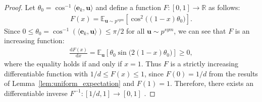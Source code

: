 \begin{proof}
Let $\theta_0=\cos^{-1}\langle \bm{e}_k, \bm{u} \rangle$ and define a function $F:[0,1]\rightarrow\mathbb{R}$ as follows:
\begin{align}
    F(x) = \mathbb{E}_{\bm{u}\sim p^{sym}}\left[ \cos^2\big( (1-x)\theta_0 \big) \right].
\end{align}
Since $0\leq\theta_0=\cos^{-1}(\langle \bm{e}_k, \bm{u} \rangle)\leq \pi/2$ for all $\bm{u}\sim p^{sym}$, we can see that $F$ is an increasing function:
\begin{align}
    \frac{\mathrm{d}F(x)}{\mathrm{d}x} = \mathbb{E}_{\bm{u}}\left[ \theta_0 \sin\big( 2(1-x)\theta_0 \big) \right] \geq 0 ,
\end{align}
where the equality holds if and only if $x=1$.
Thus $F$ is a strictly increasing differentiable function with $1/d \leq F(x) \leq 1$, since $F(0)=1/d$ from the results of Lemma~\eqref{lem:uniform_expectation} and $F(1)=1$.
Therefore, there exists an differentiable inverse $F^{-1}:[1/d,1]\rightarrow[0,1]$ . 


\end{proof}
